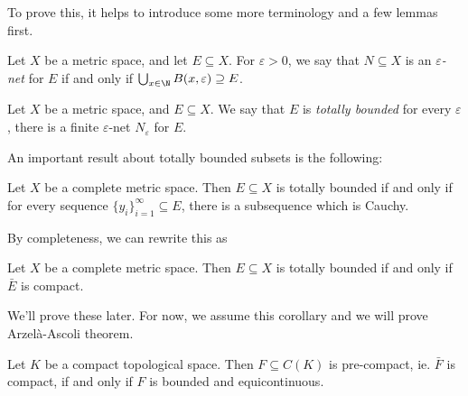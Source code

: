 \documentclass[a4paper]{article}
\begin{document}
To prove this, it helps to introduce some more terminology and a few lemmas first.

\begin{defi}
  Let $X$ be a metric space, and let $E\subseteq X$. For $\varepsilon > 0$, we say that $N \subseteq X$ is an \emph{$\varepsilon$-net} for $E$ if and only if $\bigcup_{x \in \N}B(x, \varepsilon) \supseteq E$.
\end{defi}

\begin{defi}
  Let $X$ be a metric space, and $E\subseteq X$. We say that $E$ is \emph{totally bounded} for every $\varepsilon$, there is a finite $\varepsilon$-net $N_\varepsilon$ for $E$.
\end{defi}

An important result about totally bounded subsets is the following:
\begin{prop}
  Let $X$ be a complete metric space. Then $E\subseteq X$ is totally bounded if and only if for every sequence $\{y_i\}_{i = 1}^\infty \subseteq E$, there is a subsequence which is Cauchy.
\end{prop}

By completeness, we can rewrite this as
\begin{cor}
  Let $X$ be a complete metric space. Then $E\subseteq X$ is totally bounded if and only if $\bar{E}$ is compact.
\end{cor}

We'll prove these later. For now, we assume this corollary and we will prove Arzel\`a-Ascoli theorem.
\begin{thm}
  Let $K$ be a compact topological space. Then $F\subseteq C(K)$ is pre-compact, ie. $\bar{F}$ is compact, if and only if $F$ is bounded and equicontinuous.
\end{thm}
\end{document}
